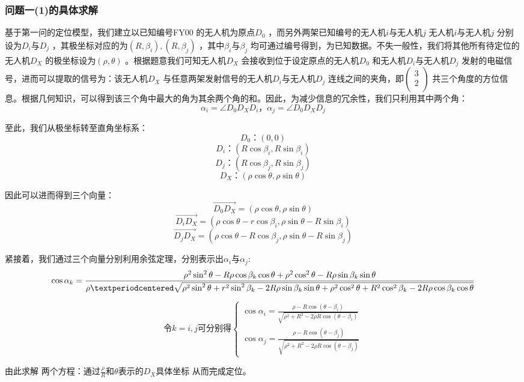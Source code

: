 \documentclass[withoutpreface,bwprint]{cumcmthesis} %
\begin{document}
			\subsubsection{问题一(1)的具体求解}
			\par 基于第一问的定位模型，我们建立以已知编号FY$ 00 $ 的无人机为原点$ D_0 $ ，而另外两架已知编号的$ \text{无人机}i\text{与无人机}j $ $ \text{无人机}i\text{与无人机}j $ 分别设为$ D_i\text{与}D_j $ ，其极坐标对应的为$ \left( R,\beta _i \right) ,\left( R,\beta _j \right)  $ ，其中$ \beta _i\text{与}\beta _j $ 均可通过编号得到，为已知数据。不失一般性，我们将其他所有待定位的无人机$ D_X $ 的极坐标设为$ \left( \rho ,\theta \right)  $ 。根据题意我们可知无人机$  D_X $ 会接收到位于设定原点的无人机$ D_0 $ 和$ \text{无人机}D_i\text{与无人机}D_j $ 发射的电磁信号，进而可以提取的信号为：该无人机$ D_X $ 与任意两架发射信号的$ \text{无人机}D_i\text{与无人机}D_j $ 连线之间的夹角，即$ \left( \begin{array}{c} 	3\\ 	2\\ \end{array} \right)  $ 共三个角度的方位信息。根据几何知识，可以得到该三个角中最大的角为其余两个角的和。因此，为减少信息的冗余性，我们只利用其中两个角：$$ \alpha _i=\angle D_0 D_X D_i\text{，}\alpha _j=\angle D_0 D_X D_j $$ 
			\par 至此，我们从极坐标转至直角坐标系： 
			$$ D_0\text{：}\left( 0,0 \right)  $$ $$ D_i\text{：}\left( R\cos \beta _i,R\sin \beta _i \right)  $$ $$ D_j\text{：}\left( R\cos \beta _j,R\sin \beta _j \right)  $$ $$ D_X\text{：}\left( \rho \cos \theta ,\rho \sin \theta \right)  $$ 
			\par 因此可以进而得到三个向量：
			$$ \overrightarrow{D_0D_X}=\left( \rho \cos \theta ,\rho \sin \theta \right)  $$ $$ \overrightarrow{D_iD_X}=\left( \rho \cos \theta -r\cos \beta _i,\rho \sin \theta -R\sin \beta _i \right)  $$ $$ \overrightarrow{D_jD_X}=\left( \rho \cos \theta -R\cos \beta _j,\rho \sin \theta -R\sin \beta _j \right)  $$ 	
			\par 紧接着，我们通过三个向量分别利用余弦定理，分别表示出$ \alpha _i\text{与}\alpha _j $: 
			$$ \cos \alpha _k=\frac{\rho ^2\sin ^2\theta -R\rho \cos \beta _k\cos \theta +\rho ^2\cos ^2\theta -R\rho \sin \beta _k\sin \theta}{\rho ·\sqrt{\rho ^2\sin ^2\theta +r^2\sin ^2\beta _k-2R\rho \sin \beta _k\sin \theta +\rho ^2\cos ^2\theta +R^2\cos ^2\beta _k-2R\rho \cos \beta _k\cos \theta}}\\   $$ 
			
			$$\text{令} k=i,j\text{可分别得}\left\{ \begin{array}{l} 	\cos \alpha _i=\frac{\rho -R\cos \left( \theta -\beta _i \right)}{\sqrt{\rho ^2+R^2-2\rho R\cos \left( \theta -\beta _i \right)}}\\ 	\cos \alpha _j=\frac{\rho -R\cos \left( \theta -\beta _j \right)}{\sqrt{\rho ^2+R^2-2\rho R\cos \left( \theta -\beta _j \right)}} \end{array} \right.  $$ 
			\par 由此求解 两个方程：$ \text{通过}\frac{\rho}{R}\text{和}\theta \text{表示的}D_X\text{具体坐标} $ 从而完成定位。
			
\end{document}
